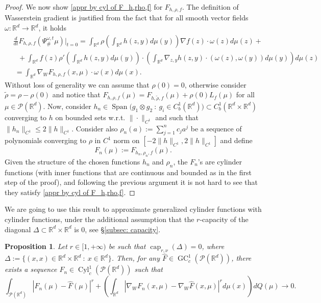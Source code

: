 \documentclass[10pt,leqno]{amsart}
\numberwithin{equation}{section}
\newtheorem{prop}[teorema]{Proposition}
\newcommand{\R}{\mathbb{R}}
\newcommand{\Q}{\mathbb{Q}}
\newcommand{\PP}{\mathcal{P}}
\renewcommand{\Q}{Q}
\begin{document}
\begin{proof}
	We now show \eqref{appr by cyl of F_h,rho,f} for $F_{h,\rho,f}$.
    The definition of Wasserstein gradient is justified from the fact that for all smooth vector fields $\omega: \R^d \to \R^d$, it holds
    \begin{align*}
        & \frac{d}{dt}F_{h,\rho,f}(\Psi^{\omega,t}_\#\mu) |_{t=0} 
        = \int_{\R^d}\rho\left( \int_{\R^d} h(z,y) d\mu(y) \right) \nabla f(z) \cdot \omega(z)d\mu(z) + 
        \\
        & \ \ \ + \int_{\R^d} f(z) \rho'\left(\int_{\R^d} h(z,y) d\mu(y)\right) \cdot \left(\int_{\R^d}\nabla_{z,y} h(z,y)\cdot (\omega(z),\omega(y)) d\mu(y) \right) d\mu(z)
        \\
        & \ = \int_{\R^d} \nabla_W F_{h,\rho,f}(x,\mu)\cdot \omega(x) d\mu(x).
    \end{align*}
    Without loss of generality we can assume that $\rho(0) = 0$, otherwise consider $\tilde{\rho} = \rho - \rho(0)$ and notice that $F_{h,\rho,f}(\mu) = F_{h,\tilde{\rho},f}(\mu) + \rho(0)L_{f}(\mu)$ for all $\mu\in \PP(\R^d)$.
    Now, consider $h_n \in \operatorname{Span}\big( g_1\otimes g_2 \ : \ g_i\in C_b^1(\R^d) \big)\subset C_b^1(\R^d\times \R^d)$ converging to $h$ on bounded sets w.r.t. $\|\cdot\|_{C^1}$ and such that $\|h_n\|_{C^1}\leq 2\|h\|_{C^1}$. Consider also $\rho_n(a) := \sum_{j=1}^n c_j a^j$ be a sequence of polynomials converging to $\rho$ in $C^1$ norm on $[-2\|h\|_{C^1}, 2\|h \|_{C^1} ]$ and define 
    \[F_n(\mu):= F_{h_n,\rho_n,f}(\mu).\]
    Given the structure of the chosen functions $h_n$ and $\rho_n$, the $F_n$'s are cylinder functions (with inner functions that are continuous and bounded as in the first step of the proof), and following the previous argument it is not hard to see that they satisfy \eqref{appr by cyl of F_h,rho,f}.
\end{proof}

We are going to use this result to approximate generalized cylinder functions with cylinder functions, under the additional assumption that the $r$-capacity of the diagonal $\Delta  \subset \R^d\times \R^d$ is $0$, see §\ref{subsec: capacity}.


\begin{prop}\label{prop: approx GC with cyl}
    Let $r\in[1,+\infty)$ be such that $\operatorname{cap}_{r,\nu}(\Delta) = 0$, where $\Delta := \{(x,x)\in \R^d\times\R^d\ : \ x\in \R^d \}$. Then, for any $\hat{F}\in \operatorname{GC}_c^1(\PP(\R^d))$, there exists a sequence $F_n \in \operatorname{Cyl}_c^1(\PP(\R^d))$ such that 
    \begin{equation}\label{eq: appr of GC from cyl}
        \int_{\PP(\R^d)} |F_n(\mu) - \hat{F}(\mu)|^r +\left( \int_{\R^d} |\nabla_WF_n(x,\mu) - \nabla_W \hat{F}(x,\mu)|^rd\mu(x) \right) d\Q(\mu) \to 0.
    \end{equation}
\end{prop}
\end{document}
